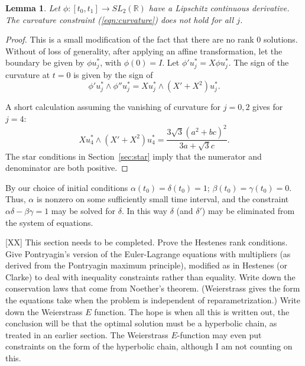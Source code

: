 \documentclass[11pt]{amsart}
\newtheorem{lemma}{Lemma}
\newcommand{\ring}[1]{\mathbb{#1}}
\begin{document}
\begin{lemma}  Let $\phi:[t_0,t_1]\to SL_2(\ring{R})$ have a Lipschitz
continuous derivative.  The curvature constraint (\ref{eqn:curvature}) does
not hold for all $j$.
\end{lemma}

\begin{proof}  %
This is a small modification of the fact that there are no rank $0$ solutions.  Without of loss of generality, after applying an affine transformation, let the boundary be given by
$\phi u^*_j$, with $\phi(0)=I$.  Let $\phi' u^*_j = X\phi u^*_j$.
The sign of the curvature at $t=0$ is given by the sign of
$$
\phi' u^*_j \land \phi'' u^*_j = X u^*_j \land (X' + X^2) u^*_j.
$$

A short calculation
assuming the vanishing of curvature for $j=0,2$ gives for $j=4$:
$$
X u^*_4 \land (X' + X^2) u^*_4 = \frac{3\sqrt{3} (a^2 + b c)^2}{3 a + \sqrt{3} c}.
$$
The star conditions in Section~\ref{sec:star} imply that the numerator and denominator are both positive.

\end{proof}


By our choice of initial conditions $\alpha(t_0)=\delta(t_0)=1$; $\beta(t_0)=\gamma(t_0)=0$.  Thus, $\alpha$ is nonzero on some sufficiently small time
interval, and the constraint $\alpha\delta-\beta\gamma=1$ may be solved
for $\delta$.  In this way $\delta$ (and $\delta'$)
may be eliminated from the system of equations.

[XX] This section needs to be completed.  Prove the Hestenes rank conditions.  Give Pontryagin's version of the Euler-Lagrange equations with multipliers (as derived from the Pontryagin maximum principle), modified as in Hestenes (or Clarke) to deal with inequality constraints rather than equality.  Write down the conservation laws that come from Noether's theorem.  (Weierstrass gives the form the equations take when the problem is independent of reparametrization.) Write down the Weierstrass $E$ function.  The hope is when all this is written out, the conclusion will be that the optimal solution must be a hyperbolic chain, as treated in an earlier section. The Weierstrass $E$-function may even put constraints on the form of the hyperbolic chain, although I am not counting on this.
\end{document}
